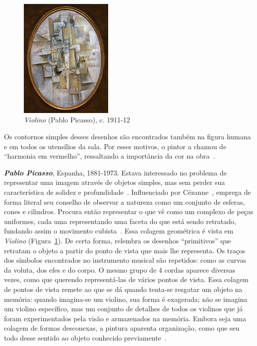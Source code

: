 \begin{figure}
  \begin{center}
    \includegraphics[width=0.4\textwidth]{figs/picasso_violino.png}
  \end{center}
  \caption{\emph{Violino} (Pablo Picasso), c. 1911-12}
  \label{fig:picasso:violino}
\end{figure}


Os contornos simples desses desenhos são encontrados também na figura
humana e em todos os utensílios da sala. Por esses motivos, o pintor a
chamou de ``harmonia em vermelho'', ressaltando a importância da cor
na obra~\cite{matisse}.

\textbf{\emph{Pablo Picasso}}, Espanha, 1881-1973. Estava interessado
no problema de representar uma imagem através de objetos simples, mas
sem perder sua característica de solidez e
profundidade~\cite{daix,gombrich}. Influenciado por
Cézanne~\cite{rishel}, emprega de forma literal seu conselho de
observar a natureza como um conjunto de esferas, cones e
cilindros. Procura então representar o que vê como um complexo de
peças uniformes, cada uma representando uma faceta do que está sendo
retratado, fundando assim o movimento cubista~\cite{barr,golding}.
Essa colagem geométrica é vista em \emph{Violino}
(Figura~\ref{fig:picasso:violino}). De certa forma, relembra os
desenhos ``primitivos'' que retratam o objeto a partir do ponto de
vista que mais lhe representa. Os traços dos símbolos encontrados no
instrumento musical são repetidos: como as curvas da voluta, dos efes
e do corpo. O mesmo grupo de 4 cordas aparece diversas vezes, como que
querendo representá-las de vários pontos de vista. Essa colagem de
pontos de vista remete ao que se dá quando tenta-se resgatar um objeto
na memória: quando imagina-se um violino, sua forma é exagerada; não
se imagina um violino específico, mas um conjunto de detalhes de todos
os violinos que já foram experimentados pela visão e armazenados na
memória. Embora seja uma colagem de formas desconexas, a pintura
aparenta organização, como que seu todo desse sentido ao objeto
conhecido previamente~\cite{gombrich}.

